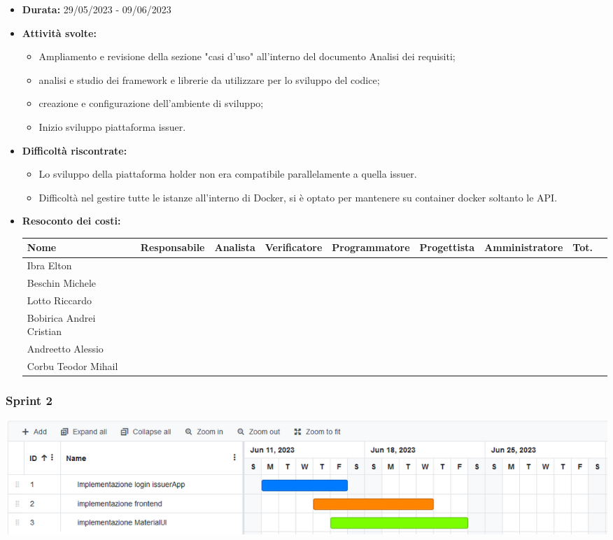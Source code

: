 \begin{itemize}
\item \textbf{Durata:} 29/05/2023 - 09/06/2023 
\item \textbf{Attività svolte:}
\begin{itemize}
    \item Ampliamento e revisione della sezione "casi d'uso" all'interno del documento Analisi dei requisiti;
    \item analisi e studio dei framework e librerie da utilizzare per lo sviluppo del codice;
    \item creazione e configurazione dell'ambiente di sviluppo;
    \item Inizio sviluppo piattaforma issuer.
\end{itemize}
\item \textbf{Difficoltà riscontrate:}
\begin{itemize}
    \item Lo sviluppo della piattaforma holder non era compatibile parallelamente a quella issuer. 
    \item Difficoltà nel gestire tutte le istanze all'interno di Docker\glo, si è optato per mantenere su container docker soltanto le API.
\end{itemize}
\item \textbf{Resoconto dei costi:}
\begin{longtable}{|p{}|c|c|c|c|c|c|c|c|}
    \hline
    Nome & Responsabile & Analista & Verificatore & Programmatore & Progettista & Amministratore & Tot.\\
    \hline
    Ibra Elton & & & & & & &\\
    \hline
    Beschin Michele & & & & & & & \\
    \hline
    Lotto Riccardo & & & & & & & \\
    \hline
    Bobirica Andrei Cristian & & & & & & & \\
    \hline
    Andreetto Alessio & & & & & & & \\
    \hline
    Corbu Teodor Mihail & & & & & & & \\
    \hline
\end{longtable}
\end{itemize}

\subsubsection{Sprint 2}
\begin{center}
    \includegraphics[scale = 0.45]{./res/img/Sprint_2.png}
  \end{center}

